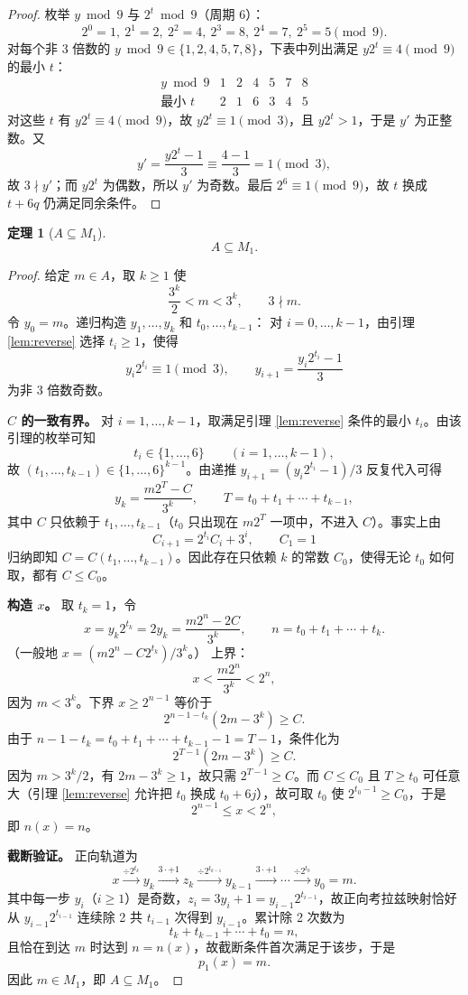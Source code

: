 \documentclass[11pt]{article}
\newtheorem{theorem}{定理}[section]
\theoremstyle{definition}
\theoremstyle{definition}
\theoremstyle{remark}
\begin{document}
\begin{proof}
枚举 \(y\bmod9\) 与 \(2^t\bmod9\)（周期 6）：
\[
2^0=1,\ 2^1=2,\ 2^2=4,\ 2^3=8,\ 2^4=7,\ 2^5=5 \pmod9.
\]
对每个非 3 倍数的 \(y\bmod9\in\{1,2,4,5,7,8\}\)，下表中列出满足 \(y2^t\equiv4\pmod9\) 的最小 \(t\)：
\[
\begin{array}{c|cccccc}
y\bmod9 & 1 & 2 & 4 & 5 & 7 & 8\\\hline
\text{最小 }t & 2 & 1 & 6 & 3 & 4 & 5
\end{array}
\]
对这些 \(t\) 有 \(y2^t\equiv4\pmod9\)，故 \(y2^t\equiv1\pmod3\)，且 \(y2^t>1\)，于是 \(y'\) 为正整数。又
\[
y'=\frac{y2^t-1}{3}\equiv\frac{4-1}{3}=1\pmod3,
\]
故 \(3\nmid y'\)；而 \(y2^t\) 为偶数，所以 \(y'\) 为奇数。最后 \(2^6\equiv1\pmod9\)，故 \(t\) 换成 \(t+6q\) 仍满足同余条件。
\end{proof}

\begin{theorem}[\(A\subseteq M_1\)]\label{thm:AsubM1}
\[
A\subseteq M_1.
\]
\end{theorem}

\begin{proof}
给定 \(m\in A\)，取 \(k\ge1\) 使
\[
\frac{3^k}{2}<m<3^k,\qquad 3\nmid m.
\]
令 \(y_0=m\)。递归构造 \(y_1,\dots,y_k\) 和 \(t_0,\dots,t_{k-1}\)：
对 \(i=0,\dots,k-1\)，由引理 \ref{lem:reverse} 选择 \(t_i\ge1\)，使得
\[
y_i2^{t_i}\equiv1\pmod3,\qquad
y_{i+1}=\frac{y_i2^{t_i}-1}{3}
\]
为非 3 倍数奇数。

\textbf{\(C\) 的一致有界。}
对 \(i=1,\dots,k-1\)，取满足引理 \ref{lem:reverse} 条件的最小 \(t_i\)。由该引理的枚举可知
\[
t_i\in\{1,\dots,6\}\qquad(i=1,\dots,k-1),
\]
故 \((t_1,\dots,t_{k-1})\in\{1,\dots,6\}^{k-1}\)。由递推 \(y_{i+1}=(y_i2^{t_i}-1)/3\) 反复代入可得
\[
y_k=\frac{m2^{T}-C}{3^k},\qquad T=t_0+t_1+\cdots+t_{k-1},
\]
其中 \(C\) 只依赖于 \(t_1,\dots,t_{k-1}\)（\(t_0\) 只出现在 \(m2^T\) 一项中，不进入 \(C\)）。事实上由
\[
C_{i+1}=2^{t_i}C_i+3^i,\qquad C_1=1
\]
归纳即知 \(C=C(t_1,\dots,t_{k-1})\)。因此存在只依赖 \(k\) 的常数 \(C_0\)，使得无论 \(t_0\) 如何取，都有 \(C\le C_0\)。

\textbf{构造 \(x\)。}
取 \(t_k=1\)，令
\[
x=y_k2^{t_k}=2y_k=\frac{m2^{n}-2C}{3^k},\qquad n=t_0+t_1+\cdots+t_k .
\]
（一般地 \(x=(m2^n-C2^{t_k})/3^k\)。）
上界：
\[
x<\frac{m2^n}{3^k}<2^n,
\]
因为 \(m<3^k\)。下界 \(x\ge2^{n-1}\) 等价于
\[
2^{n-1-t_k}(2m-3^k)\ge C .
\]
由于 \(n-1-t_k=t_0+t_1+\cdots+t_{k-1}-1=T-1\)，条件化为
\[
2^{T-1}(2m-3^k)\ge C .
\]
因为 \(m>3^k/2\)，有 \(2m-3^k\ge1\)，故只需 \(2^{T-1}\ge C\)。而 \(C\le C_0\) 且 \(T\ge t_0\) 可任意大（引理 \ref{lem:reverse} 允许把 \(t_0\) 换成 \(t_0+6j\)），故可取 \(t_0\) 使 \(2^{t_0-1}\ge C_0\)，于是
\[
2^{n-1}\le x<2^n,
\]
即 \(n(x)=n\)。

\textbf{截断验证。}
正向轨道为
\[
x \xrightarrow{\div 2^{t_k}} y_k
\xrightarrow{3\cdot+1} z_k
\xrightarrow{\div 2^{t_{k-1}}} y_{k-1}
\xrightarrow{3\cdot+1} \cdots
\xrightarrow{\div 2^{t_0}} y_0=m .
\]
其中每一步 \(y_i\)（\(i\ge1\)）是奇数，\(z_i=3y_i+1=y_{i-1}2^{t_{i-1}}\)，故正向考拉兹映射恰好从 \(y_{i-1}2^{t_{i-1}}\) 连续除 2 共 \(t_{i-1}\) 次得到 \(y_{i-1}\)。累计除 2 次数为
\[
t_k+t_{k-1}+\cdots+t_0=n,
\]
且恰在到达 \(m\) 时达到 \(n=n(x)\)，故截断条件首次满足于该步，于是
\[
p_1(x)=m .
\]
因此 \(m\in M_1\)，即 \(A\subseteq M_1\)。
\end{proof}
\end{document}
